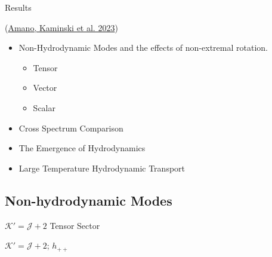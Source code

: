 \documentclass[xcolor=dvipsnames]{beamer}
\begin{document}
\begin{frame}{Results}

  (\href{https://arxiv.org/abs/2308.11686}{Amano, Kaminski et al. 2023})

  \begin{itemize}
    \item Non-Hydrodynamic Modes and the effects of non-extremal rotation.
      \begin{itemize}
        \item Tensor
        \item Vector
        \item Scalar
      \end{itemize}
    \item Cross Spectrum Comparison
    \item The Emergence of Hydrodynamics
    \item Large Temperature Hydrodynamic Transport
  \end{itemize}
\end{frame}

\subsection{Non-hydrodynamic Modes}

\begin{frame}{\(\mathcal K' = \mathcal J + 2\) Tensor Sector}
  \begin{center}
  \end{center}

  \(\mathcal K' = \mathcal J + 2\); \(h_{++}\)
\end{frame}
\end{document}
